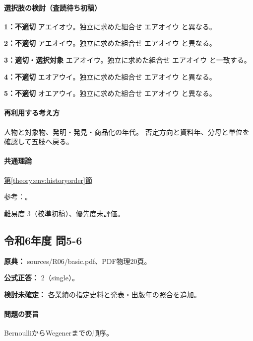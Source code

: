 \paragraph{選択肢の検討（査読待ち初稿）}\mbox{}\par

\noindent\textbf{1：不適切} アエイオウ。独立に求めた組合せ エアオイウ と異なる。\par

\noindent\textbf{2：不適切} アエオイウ。独立に求めた組合せ エアオイウ と異なる。\par

\noindent\textbf{3：適切・選択対象} エアオイウ。独立に求めた組合せ エアオイウ と一致する。\par

\noindent\textbf{4：不適切} エオアウイ。独立に求めた組合せ エアオイウ と異なる。\par

\noindent\textbf{5：不適切} オエアウイ。独立に求めた組合せ エアオイウ と異なる。\par

\paragraph{再利用する考え方} 人物と対象物、発明・発見・商品化の年代。 否定方向と資料年、分母と単位を確認して五肢へ戻る。

\paragraph{共通理論} \hyperref[theory:env:historyorder]{第\ref*{theory:env:historyorder}節}

\par 参考：\cite{env58_nylon}。

\par 難易度 3（校準初稿）、優先度未評価。

\subsection{令和6年度 問5-6}
\label{q:r06-reg-basic-5-6}

\noindent\textbf{原典：} sources/R06/basic.pdf、PDF物理20頁。

\textbf{公式正答：} 2（single）。

\par\textbf{検討未確定：} 各業績の指定史料と発表・出版年の照合を追加。

\paragraph{問題の要旨} BernoulliからWegenerまでの順序。

